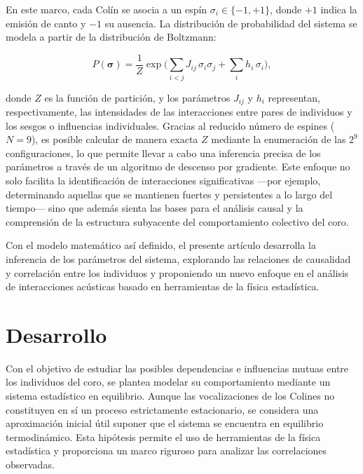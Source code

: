 \documentclass[a4paper,10pt,twocolumn]{article}
\begin{document}
En este marco, cada Colín se asocia a un espín \( \sigma_i \in \{-1, +1\} \), donde \( +1 \) indica la emisión de canto y \(-1\) su ausencia. La distribución de probabilidad del sistema se modela a partir de la distribución de Boltzmann:

\[
P(\boldsymbol{\sigma}) = \frac{1}{Z} \exp\Biggl( \sum_{i<j} J_{ij}\, \sigma_i \sigma_j + \sum_{i} h_i\, \sigma_i \Biggr),
\]

donde \( Z \) es la función de partición, y los parámetros \( J_{ij} \) y \( h_i \) representan, respectivamente, las intensidades de las interacciones entre pares de individuos y los sesgos o influencias individuales. Gracias al reducido número de espines (\( N = 9 \)), es posible calcular de manera exacta \( Z \) mediante la enumeración de las \( 2^9 \) configuraciones, lo que permite llevar a cabo una inferencia precisa de los parámetros a través de un algoritmo de descenso por gradiente. Este enfoque no solo facilita la identificación de interacciones significativas —por ejemplo, determinando aquellas que se mantienen fuertes y persistentes a lo largo del tiempo— sino que además sienta las bases para el análisis causal y la comprensión de la estructura subyacente del comportamiento colectivo del coro.

Con el modelo matemático así definido, el presente artículo desarrolla la inferencia de los parámetros del sistema, explorando las relaciones de causalidad y correlación entre los individuos y proponiendo un nuevo enfoque en el análisis de interacciones acústicas basado en herramientas de la física estadística.




\section{Desarrollo}\label{sec:dev}
  
Con el objetivo de estudiar las posibles dependencias e 
influencias mutuas entre los individuos del coro, 
se plantea modelar su comportamiento mediante un sistema 
estadístico en equilibrio. Aunque las vocalizaciones de los 
Colines no constituyen en sí un proceso estrictamente 
estacionario, se considera una aproximación inicial útil 
suponer que el sistema se encuentra en equilibrio termodinámico. 
Esta hipótesis permite el uso de herramientas de la física 
estadística y proporciona un marco riguroso para analizar las 
correlaciones observadas.
\end{document}
